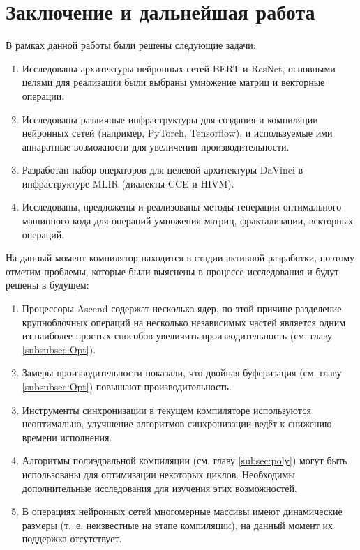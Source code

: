 \section{Заключение и дальнейшая работа}
\label{sec:Conclusion} 

В рамках данной работы были решены следующие задачи:

\begin{enumerate}
    \item Исследованы архитектуры нейронных сетей BERT и ResNet,
          основными целями для реализации были выбраны умножение матриц и
          векторные операции.
    \item Исследованы различные инфраструктуры для создания и компиляции
          нейронных сетей (например, PyTorch, Tensorflow), и используемые ими
          аппаратные возможности для увеличения производительности.
    \item Разработан набор операторов для целевой архитектуры DaVinci в
          инфраструктуре MLIR (диалекты CCE и HIVM).
    \item Исследованы, предложены и реализованы методы генерации оптимального машинного
          кода для операций умножения матриц, фрактализации, векторных операций.
\end{enumerate}

На данный момент компилятор находится в стадии активной разработки, поэтому
отметим проблемы, которые были выяснены в процессе исследования и будут решены
в будущем:

\begin{enumerate}
    \item Процессоры Ascend содержат несколько ядер, по этой причине разделение
          крупноблочных операций на несколько независимых частей является одним
          из наиболее простых способов увеличить производительность (см.
          главу \ref{subsubsec:Opt}).
    \item Замеры производительности показали, что двойная буферизация (см.
          главу \ref{subsubsec:Opt}) повышают производительность.
    \item Инструменты синхронизации в текущем компиляторе используются
          неоптимально, улучшение алгоритмов синхронизации ведёт к снижению
          времени исполнения.
    \item Алгоритмы полиэдральной компиляции (см. главу \ref{subsec:poly})
          могут быть использованы для оптимизации некоторых циклов. Необходимы
          дополнительные исследования для изучения этих возможностей.
    \item В операциях нейронных сетей многомерные массивы имеют динамические
          размеры (т.~е. неизвестные на этапе компиляции), на данный момент
          их поддержка отсутствует.
\end{enumerate}

\newpage
